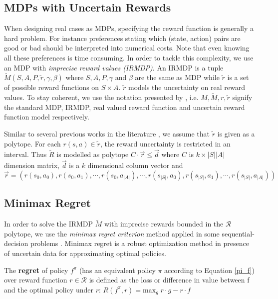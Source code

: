 \documentclass[runningheads,a4paper]{llncs}
\begin{document}
\subsection{MDPs with Uncertain Rewards}
When designing real cases as MDPs, specifying the reward function is generally a hard problem. For instance preferences stating which (state, action) pairs are good or bad should be interpreted into numerical costs. Note that even knowing all these preferences is time consuming. In order to
tackle this complexity, we use an MDP with \textit{imprecise reward values (IRMDP)}. An IRMDP \citep{Regan2009} is a tuple $\tilde{M}(S, A, P, \tilde{r}, \gamma, \beta)$ where $S, A, P, \gamma$ and $\beta$ are the same as MDP while $\tilde{r}$ is a set of possible reward functions on $S \times A$. $\tilde{r}$ models the uncertainty on real reward values. To stay coherent, we use the notation presented by , i.e. $M, \tilde{M}, r, \tilde{r}$ signify the standard MDP, IRMDP, real valued reward function and uncertain reward function model respectively.  

Similar to several previous works in the literature \cite{Ahmed2017,alizadeh2015,benavent2018,Regan2009,Weng2013}, we assume that $\tilde{r}$ is given as a polytope. For each $r(s,a) \in \tilde{r}$, the reward uncertainty is restricted in an interval. Thus $\tilde{R}$ is modelled as polytope $C \cdot \overrightarrow{r} \leq \overrightarrow{d}$ where $C$ is $k \times |S||A|$ dimension matrix, $\overrightarrow{d}$ is a $k$ dimensional column vector and $\overrightarrow{r} = (r(s_0,a_0), r(s_0,a_1), \cdots, r(s_0,a_{|A|}), \cdots, r( s_{|S|},a_0), r(s_{|S|},a_1), \cdots, r(s_{|S|},a_{|A|}) )$
 

\subsection{Minimax Regret}
In order to solve the IRMDP $\tilde{M}$ with imprecise rewards bounded in the $\mathcal{R}$ polytope, we use the \textit{minimax regret criterion} method applied in some sequential-decision problems \cite{Regan2009,Xu2009}. Minimax regret is a robust optimization method in presence of uncertain data for approximating optimal policies. 

\begin{definition}
The \textbf{regret} of policy $f^{\pi}$ (has an equivalent policy $\pi$ according to Equation \ref{pi_f}) over reward function $r \in \mathcal{R}$ is defined as the loss or difference in value between f and the optimal policy under $r$: $R(f^{\pi}, r) = \text{max}_{g} \; r \cdot g - r \cdot f$
\end{definition}
\end{document}
